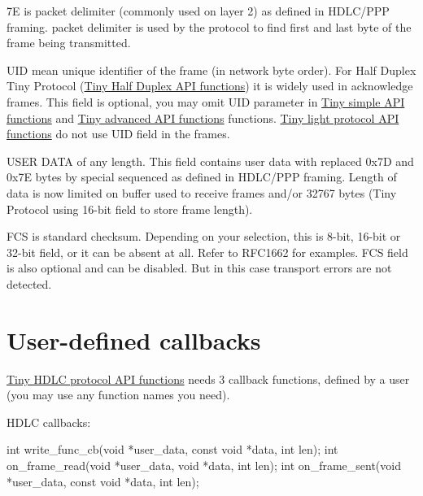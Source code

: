 \begin{DoxyItemize}
\item 7E is packet delimiter (commonly used on layer 2) as defined in H\+D\+L\+C/\+P\+PP framing. packet delimiter is used by the protocol to find first and last byte of the frame being transmitted.
\item U\+ID mean unique identifier of the frame (in network byte order). For Half Duplex Tiny Protocol (\hyperlink{group__HALF__DUPLEX__API}{Tiny Half Duplex A\+PI functions}) it is widely used in acknowledge frames. This field is optional, you may omit U\+ID parameter in \hyperlink{group__SIMPLE__API}{Tiny simple A\+PI functions} and \hyperlink{group__ADVANCED__API}{Tiny advanced A\+PI functions} functions. \hyperlink{group__LIGHT__API}{Tiny light protocol A\+PI functions} do not use U\+ID field in the frames.
\item U\+S\+ER D\+A\+TA of any length. This field contains user data with replaced 0x7D and 0x7E bytes by special sequenced as defined in H\+D\+L\+C/\+P\+PP framing. Length of data is now limited on buffer used to receive frames and/or 32767 bytes (Tiny Protocol using 16-\/bit field to store frame length).
\item F\+CS is standard checksum. Depending on your selection, this is 8-\/bit, 16-\/bit or 32-\/bit field, or it can be absent at all. Refer to R\+F\+C1662 for examples. F\+CS field is also optional and can be disabled. But in this case transport errors are not detected.
\end{DoxyItemize}\hypertarget{index_callback}{}\section{User-\/defined callbacks}\label{index_callback}
\hyperlink{group__HDLC__API}{Tiny H\+D\+LC protocol A\+PI functions} needs 3 callback functions, defined by a user (you may use any function names you need).

H\+D\+LC callbacks\+: 
\begin{DoxyCode}
\textcolor{keywordtype}{int} write\_func\_cb(\textcolor{keywordtype}{void} *user\_data, \textcolor{keyword}{const} \textcolor{keywordtype}{void} *data, \textcolor{keywordtype}{int} len);
\textcolor{keywordtype}{int} on\_frame\_read(\textcolor{keywordtype}{void} *user\_data, \textcolor{keywordtype}{void} *data, \textcolor{keywordtype}{int} len);
\textcolor{keywordtype}{int} on\_frame\_sent(\textcolor{keywordtype}{void} *user\_data, \textcolor{keyword}{const} \textcolor{keywordtype}{void} *data, \textcolor{keywordtype}{int} len);
\end{DoxyCode}



